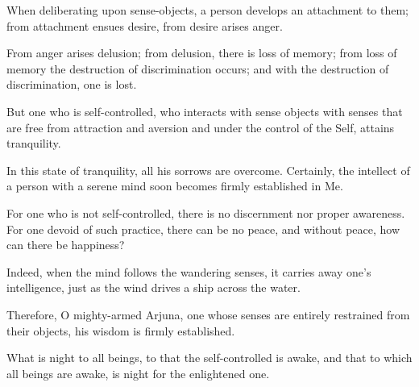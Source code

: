 {When deliberating upon sense-objects, a person develops an attachment to them; from attachment ensues desire, from desire arises anger.}

{From anger arises delusion; from delusion, there is loss of memory; from loss of memory the destruction of discrimination occurs; and with the destruction of discrimination, one is lost.}

{But one who is self-controlled, who interacts with sense objects with senses that are free from attraction and aversion and under the control of the Self, attains tranquility.}

{In this state of tranquility, all his sorrows are overcome. Certainly, the intellect of a person with a serene mind soon becomes firmly established in Me.}

{For one who is not self-controlled, there is no discernment nor proper awareness. For one devoid of such practice, there can be no peace, and without peace, how can there be happiness?}

{Indeed, when the mind follows the wandering senses, it carries away one’s intelligence, just as the wind drives a ship across the water.}

{Therefore, O mighty-armed Arjuna, one whose senses are entirely restrained from their objects, his wisdom is firmly established.}

{What is night to all beings, to that the self-controlled is awake, and that to which all beings are awake, is night for the enlightened one.}

